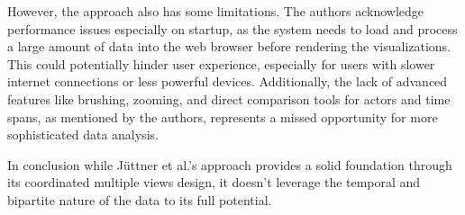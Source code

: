 \documentclass{vgtc}                          %
\begin{document}
However, the approach also has some limitations. The authors acknowledge performance issues especially on startup, as the system needs to load and process a large amount of data into the web browser before rendering the visualizations. This could potentially hinder user experience, especially for users with slower internet connections or less powerful devices. Additionally, the lack of advanced features like brushing, zooming, and direct comparison tools for actors and time spans, as mentioned by the authors, represents a missed opportunity for more sophisticated data analysis.

In conclusion while Jüttner et al.'s approach provides a solid foundation through its coordinated multiple views design, it doesn't leverage the temporal and bipartite nature of the data to its full potential.


















\end{document}
